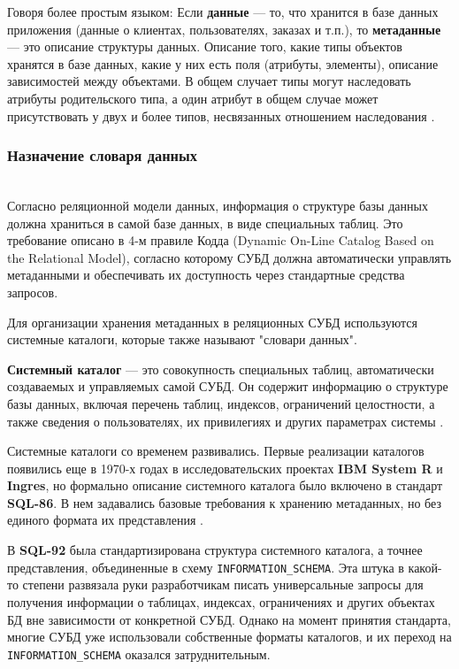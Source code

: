 Говоря более простым языком: 
Если \textbf{данные} — то, что хранится в базе данных приложения (данные о клиентах, пользователях, заказах и т.п.), то \textbf{метаданные} — это описание структуры данных. Описание того, какие типы объектов хранятся в базе данных, какие у них есть поля (атрибуты, элементы), описание зависимостей между объектами. В общем случает типы могут наследовать атрибуты родительского типа, а один атрибут в общем случае может присутствовать у двух и более типов, несвязанных отношением наследования \autocite{Metadatahabr}.

\subsubsection{Назначение словаря данных} ~\\

Согласно реляционной модели данных, информация о структуре базы данных должна храниться в самой базе данных, в виде специальных таблиц. Это требование описано в 4-м правиле Кодда (Dynamic On-Line Catalog Based on the Relational Model), согласно которому СУБД должна автоматически управлять метаданными и обеспечивать их доступность через стандартные средства запросов.

Для организации хранения метаданных в реляционных СУБД используются системные каталоги, которые также называют "словари данных".

\begin{grayquote}
    \textbf{Системный каталог} — это совокупность специальных таблиц, автоматически создаваемых и управляемых самой СУБД. Он содержит информацию о структуре базы данных, включая перечень таблиц, индексов, ограничений целостности, а также сведения о пользователях, их привилегиях и других параметрах системы \autocite{IntuitLec14}.
\end{grayquote}

Системные каталоги со временем развивались. Первые реализации каталогов появились еще в 1970-х годах в исследовательских проектах \textbf{IBM System R} и \textbf{Ingres}, но формально описание системного каталога было включено в стандарт \textbf{SQL-86}. В нем задавались базовые требования к хранению метаданных, но без единого формата их представления \autocite{DictHist}.

В \textbf{SQL-92} была стандартизирована структура системного каталога, а точнее представления, объединенные в схему \texttt{INFORMATION\_SCHEMA}. Эта штука в какой-то степени развязала руки разработчикам писать универсальные запросы для получения информации о таблицах, индексах, ограничениях и других объектах БД вне зависимости от конкретной СУБД. Однако на момент принятия стандарта, многие СУБД уже использовали собственные форматы каталогов, и их переход на \texttt{INFORMATION\_SCHEMA} оказался затруднительным.

